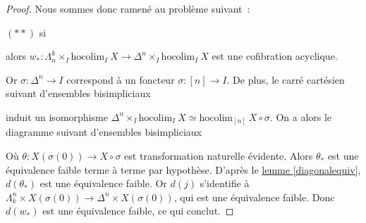 \documentclass{amsart}
\newcommand{\sref}[2]{\hyperref[#2]{#1 \ref*{#2}}}
\theoremstyle{plain}
\theoremstyle{definition}
\theoremstyle{remark}
\newcommand{\hocolim}[2]{\mathrm{hocolim}_{#1}\:{#2}}
\newcommand{\ra}{\rightarrow}
\begin{document}
\begin{proof}
  Nous sommes donc ramené au problème suivant~:

  $(**)$ si 
  alors $w_*:\Lambda^k_n\times_I\hocolim{I}{X}\ra \Delta^n\times_I\hocolim{I}{X}$ est une cofibration acyclique.

  Or $\sigma: \Delta^n\ra I$ correspond à un foncteur $\sigma: [n]\ra I$. De plus, le carré cartésien suivant d'ensembles bisimpliciaux
  \begin{center}
  \end{center}
  induit un isomorphisme $\Delta^n\times_I\hocolim{I}{X}\simeq \hocolim{[n]}{X\circ \sigma}$. On a alors le diagramme suivant d'ensembles bisimpliciaux
  \begin{center}
  \end{center}
  Où $\theta:X(\sigma(0))\ra X\circ\sigma$ est transformation naturelle évidente. Alors $\theta_*$ est une équivalence faible terme à terme par hypothèse.
  D'après le \sref{lemme}{diagonalequiv}, $d(\theta_*)$ est une équivalence faible. Or $d(j)$ s'identifie à
  $\Lambda_k^n\times X(\sigma(0))\ra \Delta^n\times X(\sigma(0))$, qui est une équivalence faible.
  Donc $d(w_*)$ est une équivalence faible, ce qui conclut.
\end{proof}
\end{document}
